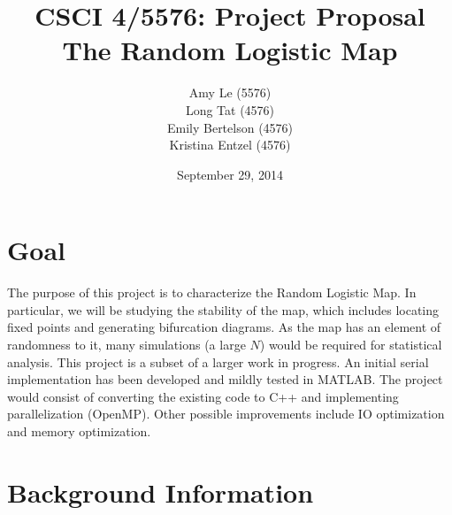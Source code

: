 \documentclass[12pt]{article}
\begin{document}
\pagestyle{plain} %
\title{CSCI 4/5576: Project Proposal \\ The Random Logistic Map}
\date{September 29, 2014}
\author{Amy Le (5576)\\Long Tat (4576)\\Emily Bertelson (4576)\\Kristina Entzel (4576)}
\maketitle

\section{Goal}
The purpose of this project is to characterize the Random Logistic
Map. In particular, we will be studying the stability of the map,
which includes locating fixed points and generating bifurcation
diagrams. As the map has an element of randomness to it, many
simulations (a large $N$) would be required for statistical analysis. This project is a subset of a larger work in progress. An
initial serial implementation has been developed and mildly tested in
MATLAB. The project would consist of converting the existing code to
C++ and implementing parallelization (OpenMP). Other possible improvements include
IO optimization and memory optimization.
\section{Background Information}
\end{document}

